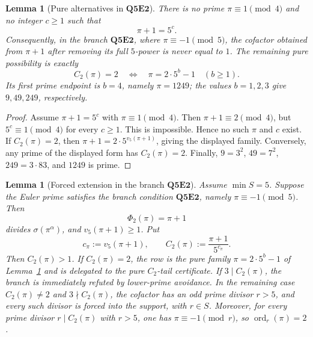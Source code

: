 \documentclass[11pt]{article}
\newtheorem{lemma}[theorem]{Lemma}
\theoremstyle{definition}
\theoremstyle{remark}
\DeclareMathOperator{\ord}{ord}
\begin{document}
\begin{lemma}[Pure alternatives in $\mathbf{Q5E2}$]
\label{lem:no-pure-q5e2-exception}
There is no prime \(\pi\equiv1\pmod4\) and no integer \(c\ge1\) such that
\[
  \pi+1=5^c.
\]
Consequently, in the branch
\(\mathbf{Q5E2}\), where \(\pi\equiv-1\pmod5\),
the cofactor obtained from \(\pi+1\) after removing its full \(5\)-power is
never equal to \(1\).  The remaining pure possibility is exactly
\[
  C_2(\pi)=2
  \quad\Longleftrightarrow\quad
  \pi=2\cdot5^b-1
  \quad(b\ge1).
\]
Its first prime endpoint is \(b=4\), namely \(\pi=1249\); the values
\(b=1,2,3\) give \(9,49,249\), respectively.
\end{lemma}

\begin{proof}
Assume \(\pi+1=5^c\) with \(\pi\equiv1\pmod4\).  Then
\(\pi+1\equiv2\pmod4\), but \(5^c\equiv1\pmod4\) for every \(c\ge1\).  This is
impossible.  Hence no such \(\pi\) and \(c\) exist.  If
\(C_2(\pi)=2\), then \(\pi+1=2\cdot5^{v_5(\pi+1)}\), giving the displayed
family.  Conversely, any prime of the displayed form has
\(C_2(\pi)=2\).  Finally, \(9=3^2\), \(49=7^2\), \(249=3\cdot83\), and
\(1249\) is prime.
\end{proof}

\begin{lemma}[Forced extension in the branch $\mathbf{Q5E2}$]
\label{lem:q5e2-forced-extension}
Assume \(\min S=5\).
Suppose the Euler prime satisfies the branch condition
\(\mathbf{Q5E2}\), namely \(\pi\equiv-1\pmod5\).
Then
\[
  \Phi_2(\pi)=\pi+1
\]
divides \(\sigma(\pi^\alpha)\), and \(v_5(\pi+1)\ge1\).
Put
\[
  c_\pi:=v_5(\pi+1),
  \qquad
  C_2(\pi):=\frac{\pi+1}{5^{c_\pi}}.
\]
Then \(C_2(\pi)>1\).  If \(C_2(\pi)=2\), the row is the pure family
\(\pi=2\cdot5^b-1\) of Lemma~\ref{lem:no-pure-q5e2-exception} and is delegated
to the pure \(C_2\)-tail certificate.  If \(3\mid C_2(\pi)\), the branch is
immediately refuted by lower-prime avoidance.  In the remaining case
\(C_2(\pi)\ne2\) and \(3\nmid C_2(\pi)\), the cofactor has an odd prime divisor
\(r>5\), and every such divisor is forced into the support, with \(r\in S\).
Moreover, for every prime divisor \(r\mid C_2(\pi)\) with \(r>5\), one has
\(\pi\equiv-1\pmod r\), so \(\ord_r(\pi)=2\).
\end{lemma}
\end{document}

